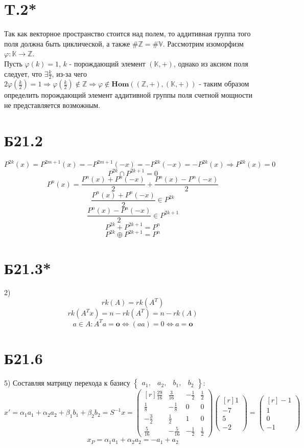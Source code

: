 \documentclass[a4paper,12pt]{article} %
\begin{document}
\section*{T.2*}
Так как векторное пространство стоится над полем, то аддитивная группа того поля должна быть циклической, а также $\#\mathbb{Z}=\#\mathbb{V}$. Рассмотрим изоморфизм $\varphi:\mathbb{K}\to\mathbb{Z}$.\\
Пусть $\varphi(k)=1$, $k$ - порождающий элемент $(\mathbb{K},+)$, однако из аксиом поля следует, что $\exists \frac{k}{2}$, из-за чего $2\varphi\left(\frac{k}{2}\right)=1\Rightarrow\varphi\left(\frac{k}{2}\right)\not\in\mathbb{Z}\Rightarrow \varphi \not\in\mathbf{Hom}((\mathbb{Z},+),(\mathbb{K},+))$ - таким образом определить порождающий элемент аддитивной группы поля счетной мощности не представляется возможным. 
\section*{Б21.2}
$$P^{2k}(x)=P^{2m+1}(x)=-P^{2m+1}(-x)=-P^{2k}(-x)=-P^{2k}(x)\Rightarrow P^{2k}(x)=0$$
$$P^{2k}\cap P^{2k+1}={0}$$
$$P^{n}(x)=\frac{P^{n}(x)+P^{n}(-x)}{2}+\frac{P^{n}(x)-P^{n}(-x)}{2}$$
$$\frac{P^{n}(x)+P^{n}(-x)}{2}\in P^{2k}$$
$$\frac{P^{n}(x)-P^{n}(-x)}{2}\in P^{2k+1}$$
$$P^{2k}+ P^{2k+1}=P^n$$
$$P^{2k}\oplus P^{2k+1}=P^{n}$$
\section*{Б21.3*}2)
$$rk(A)=rk(A^{T})$$
$$rk(A^{T}x)=n-rk(A^{T})=n-rk(A)$$
$$a\in A:A^{T}a=\textbf{o}\Leftrightarrow (aa)=0\Leftrightarrow a=\textbf{o}$$
\section*{Б21.6}5)
Составляя матрицу перехода к базису $\begin{Bmatrix}
a_1,&a_2,&b_1,&b_2
\end{Bmatrix}$:
\begin{equation*}
x'=\alpha_1a_1+\alpha_2a_2+\beta_1b_1+\beta_2b_2=S^{-1}x=
\begin{pmatrix*}[r]
\frac{29}{16}&\frac{3}{16}&-\frac{1}{2}&\frac{1}{2}\\
\frac{1}{8}&-\frac{1}{8}&0&0\\
-\frac{3}{2}&\frac{1}{2}&1&0\\
\frac{5}{16}&-\frac{5}{16}&-\frac{1}{2}&\frac{1}{2}
\end{pmatrix*}\begin{pmatrix*}[r]
1\\
-7\\
5\\
-2
\end{pmatrix*}=\begin{pmatrix*}[r]
-1\\
1\\
0\\
-1
\end{pmatrix*}
\end{equation*}
$$x_P=\alpha_1a_1+\alpha_2a_2=-a_1+a_2$$
\end{document}
